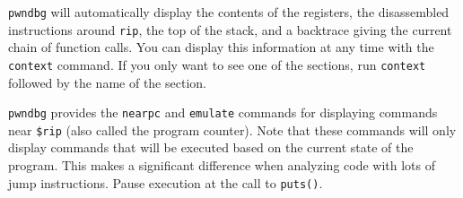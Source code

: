 \texttt{pwndbg} will automatically display the contents of the registers, the
disassembled instructions around \texttt{rip}, the top of the stack, and a
backtrace giving the current chain of function calls. You can display this
information at any time with the \texttt{context} command. If you only want to
see one of the sections, run \texttt{context} followed by the name of the
section.

\texttt{pwndbg} provides the \texttt{nearpc} and \texttt{emulate} commands for
displaying commands near \texttt{\$rip} (also called the program counter).
Note that these commands will only display commands that will be executed based
on the current state of the program. This makes a significant difference when
analyzing code with lots of jump instructions. Pause execution at the call to
\texttt{puts()}.

